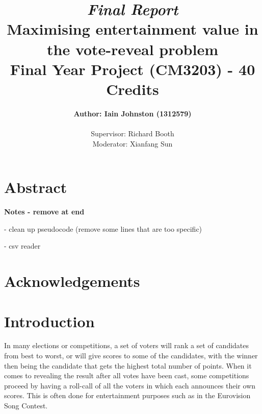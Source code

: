 \documentclass[12pt]{report}
\title{\textit{Final Report}\\\textbf{Maximising entertainment value in the vote-reveal problem}\\ Final Year Project (CM3203) - 40 Credits}
\author{\textbf{Author: Iain Johnston (1312579)} \\ \\ Supervisor: Richard Booth\\ Moderator: Xianfang Sun}
\date{} %
\begin{document}
\maketitle
\clearpage

\section*{Abstract}
\textbf{Notes - remove at end}

- clean up pseudocode (remove some lines that are too specific)

- csv reader


\section*{Acknowledgements}

\tableofcontents %
\listoffigures
\listoftables
\clearpage %

\section{Introduction}\label{Introduction}
In many elections or competitions, a set of voters will rank a set of candidates from best to worst, or will give scores to some of the candidates, with the winner then being the candidate that gets the highest total number of points. When it comes to revealing the result after all votes have been cast, some competitions proceed by having a roll-call of all the voters in which each announces their own scores. This is often done for entertainment purposes such as in the Eurovision Song Contest.\cite{EurovisionVoting}
\end{document}
